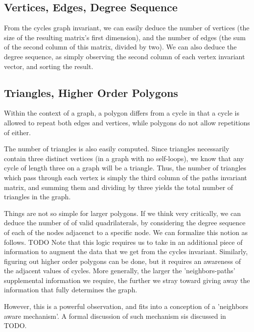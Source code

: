 \documentclass[11pt,a4paper]{report}
\begin{document}
\subsection{Vertices, Edges, Degree Sequence}
From the cycles graph invariant, we can easily deduce the number of vertices (the size of the resulting matrix's first dimension), and the number of edges (the sum of the second column of this matrix, divided by two).
We can also deduce the degree sequence, as simply observing the second column of each vertex invariant vector, and sorting the result.

\subsection{Triangles, Higher Order Polygons}
Within the context of a graph, a polygon differs from a cycle in that a cycle is allowed to repeat both edges and vertices, while polygons do not allow repetitions of either.

The number of triangles is also easily computed.  Since triangles necessarily contain three distinct vertices (in a graph with no self-loops), we know that any cycle of length three on a graph will be a triangle.
Thus, the number of triangles which pass through each vertex is simply the third column of the paths invariant matrix, and summing them and dividing by three yields the total number of triangles in the graph.

Things are not so simple for larger polygons.  If we think very critically, we can deduce the number of of valid quadrilaterals, by considering the degree sequence of each of the nodes adjacenct to a specific node.
We can formalize this notion as follows.
TODO
Note that this logic requires us to take in an additional piece of information to augment the data that we get from the cycles invariant.
Similarly, figuring out higher order polygons can be done, but it requires an awareness of the adjacent values of cycles.
More generally, the larger the 'neighbors-paths' supplemental information we require, the further we stray toward giving away the information that fully determines the graph.

However, this is a powerful observation, and fits into a conception of a 'neighbors aware mechanism'. A formal discussion of such mechanism sis discussed in TODO.
\end{document}
